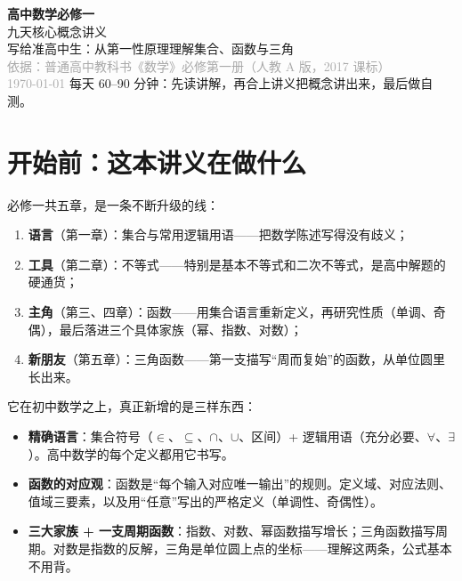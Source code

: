 \documentclass[UTF8,a4paper,11pt]{ctexart}
\begin{document}
\begin{center}
  \vspace*{2cm}
  {\Huge\bfseries\color{accent} 高中数学必修一}\\[0.4cm]
  {\LARGE 九天核心概念讲义}\\[1.2cm]
  {\large 写给准高中生：从第一性原理理解集合、函数与三角}\\[0.5cm]
  {\small\textcolor{darkgray}{依据：普通高中教科书《数学》必修第一册（人教 A 版，2017 课标）}}\\[0.3cm]
  {\small\textcolor{darkgray}{\today}}
  \vfill
  {\small 每天 60–90 分钟：先读讲解，再合上讲义把概念讲出来，最后做自测。}
\end{center}
\newpage

\tableofcontents
\newpage

\section*{开始前：这本讲义在做什么}

必修一共五章，是一条不断升级的线：

\begin{enumerate}
  \item \textbf{语言}（第一章）：集合与常用逻辑用语——把数学陈述写得没有歧义；
  \item \textbf{工具}（第二章）：不等式——特别是基本不等式和二次不等式，是高中解题的硬通货；
  \item \textbf{主角}（第三、四章）：函数——用集合语言重新定义，再研究性质（单调、奇偶），最后落进三个具体家族（幂、指数、对数）；
  \item \textbf{新朋友}（第五章）：三角函数——第一支描写“周而复始”的函数，从单位圆里长出来。
\end{enumerate}

它在初中数学之上，真正新增的是三样东西：

\begin{keyconcept}[九天要带走的三样工具]
\begin{itemize}
  \item \textbf{精确语言}：集合符号（$\in$、$\subseteq$、$\cap$、$\cup$、区间）+ 逻辑用语（充分必要、$\forall$、$\exists$）。高中数学的每个定义都用它书写。
  \item \textbf{函数的对应观}：函数是“每个输入对应唯一输出”的规则。定义域、对应法则、值域三要素，以及用“任意”写出的严格定义（单调性、奇偶性）。
  \item \textbf{三大家族 + 一支周期函数}：指数、对数、幂函数描写增长；三角函数描写周期。对数是指数的反解，三角是单位圆上点的坐标——理解这两条，公式基本不用背。
\end{itemize}
\end{keyconcept}
\end{document}
